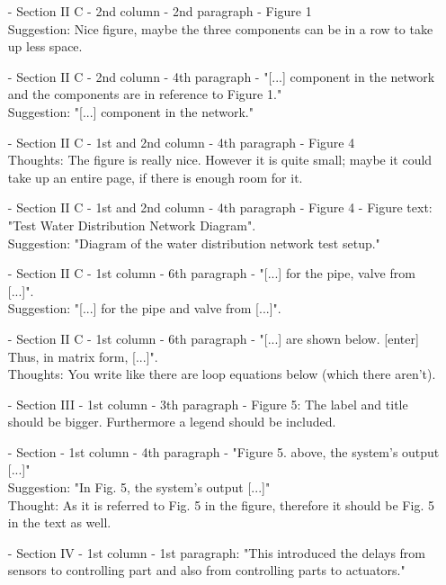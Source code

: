 \begin{itemize}
\item[-]Section II C - 2nd column - 2nd paragraph - Figure 1\\
Suggestion: Nice figure, maybe the three components can be in a row to take up less space.\\
\item[-]Section II C - 2nd column - 4th paragraph - "[...] component in the network and the components are in reference to Figure 1."\\
Suggestion: "[...] component in the network."\\
\item[-]Section II C - 1st and 2nd column - 4th paragraph - Figure 4\\
Thoughts: The figure is really nice. However it is quite small; maybe it could take up an entire page, if there is enough room for it.\\
\item[-]Section II C - 1st and 2nd column - 4th paragraph - Figure 4 - Figure text: "Test Water Distribution Network Diagram".\\
Suggestion: "Diagram of the water distribution network test setup."\\
\item[-]Section II C - 1st column - 6th paragraph - "[...] for the pipe, valve from [...]".\\
Suggestion: "[...] for the pipe and valve from [...]".\\
\item[-]Section II C - 1st column - 6th paragraph - "[...] are shown below. [enter] Thus, in matrix form, [...]".\\
Thoughts: You write like there are loop equations below (which there aren't).\\
\item[-]Section III - 1st column - 3th paragraph - Figure 5: The label and title should be bigger. Furthermore a legend should be included.\\
\item[-]Section - 1st column - 4th paragraph - "Figure 5. above, the system's output [...]"\\
Suggestion: "In Fig. 5, the system's output [...]"\\
Thought: As it is referred to Fig. 5 in the figure, therefore it should be Fig. 5 in the text as well.\\
\item[-]Section IV - 1st column - 1st paragraph: "This introduced the delays from sensors to controlling part and also from controlling parts to actuators."\\

\end{itemize}
